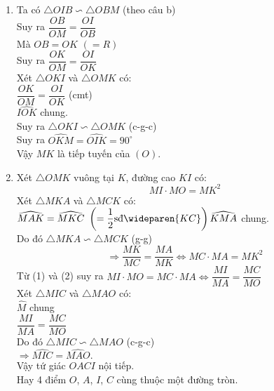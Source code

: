 \begin{ex}
{\begin{enumerate}
	$\widehat{OBI}=\widehat{OMB}\,\,\left (=\widehat{OAB} \right )\\
	\widehat{IOB}$ chung.\\
	Do đó $\triangle OIB \backsim \triangle OBM$ (g-g)
\item Ta có $\triangle OIB \backsim \triangle OBM$ (theo câu b)\\
	Suy ra $\dfrac{OB}{OM}=\dfrac{OI}{OB}$\\
	Mà $OB=OK \,\,(=R)$\\
	Suy ra $\dfrac{OK}{OM}=\dfrac{OI}{OK}$\\
	Xét $\triangle OKI$ và $\triangle OMK$ có:\\
	$\dfrac{OK}{OM}=\dfrac{OI}{OK}$  (cmt)\\
	$\widehat{IOK}$ chung.\\
	Suy ra $\triangle OKI \backsim \triangle OMK$ (c-g-c)\\
	Suy ra $\widehat{OKM} = \widehat{OIK} = 90^\circ$\\
	Vậy $MK$ là tiếp tuyến của $\left (O\right ).$
\item Xét $\triangle OMK$ vuông tại $K$, đường cao $KI$ có:
	\begin{equation}
	MI \cdot MO = MK^2
	\end{equation}
	Xét $\triangle MKA$ và $\triangle MCK$ có:\\
	$\widehat{MAK}=\widehat{MKC}\,\,\left (=\dfrac{1}{2}\text{sđ} \wideparen{KC} \right )\\
	\widehat{KMA}$ chung.\\
	Do đó $\triangle MKA \backsim \triangle MCK$ (g-g)
	\begin{equation}
	\Rightarrow \dfrac{MK}{MC}=\dfrac{MA}{MK} \Leftrightarrow MC \cdot MA = MK^2
	\end{equation}
	Từ (1) và (2) suy ra $MI \cdot MO = MC \cdot MA \Leftrightarrow 
	\dfrac{MI}{MA} = \dfrac{MC}{MO}$\\
	Xét $\triangle MIC$ và $\triangle MAO$ có:\\
	$\widehat{M}$ chung\\
	$\dfrac{MI}{MA} = \dfrac{MC}{MO}$\\
	Do đó $\triangle MIC \backsim \triangle MAO$ (c-g-c)\\
	$\Rightarrow \widehat{MIC} = \widehat{MAO}.$ \\
	Vậy tứ giác $OACI$ nội tiếp.\\
	Hay 4 điểm $O$, $A$, $I$, $C$ cùng thuộc một đường tròn.
\end{enumerate}	
	}
\end{ex}
